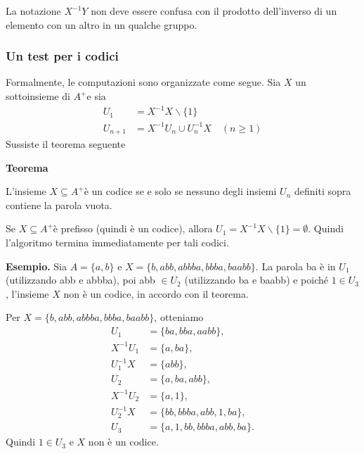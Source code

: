 La notazione $X^{-1} Y$ non deve essere confusa con il prodotto dell'inverso di un elemento con un altro in un qualche gruppo.

\subsubsection{Un test per i codici}

Formalmente, le computazioni sono organizzate come segue. Sia $X$ un sottoinsieme di $A^{+}$e sia
$$
\begin{aligned}
U_{1} &=X^{-1} X \backslash\{1\} \\
U_{n+1} &=X^{-1} U_{n} \cup U_{n}^{-1} X \quad(n \geq 1)
\end{aligned}
$$
Sussiste il teorema seguente

\vspace{5mm}

\textbf{Teorema}

L'insieme $X \subseteq A^{+}$è un codice se e solo se nessuno degli insiemi $U_{n}$ definiti sopra contiene la parola vuota.

\vspace{5mm}

Se $X \subseteq A^{+}$è prefisso (quindi è un codice), allora $U_{1}=X^{-1} X \backslash\{1\}=\emptyset$. Quindi l'algoritmo termina immediatamente per tali codici.

\textbf{Esempio.} 
Sia $A=\{a, b\}$ e $X=\{b, a b b, a b b b a, b b b a, b a a b b\} .$ La parola ba è in $U_{1}$ (utilizzando abb e abbba), poi abb $\in U_{2}$ (utilizzando ba e baabb) e poiché $1 \in U_{3}$, l'insieme $X$ non è un codice, in accordo con il teorema.

\vspace{5mm}

Per $X=\{b, a b b, a b b b a, b b b a, b a a b b\}$, otteniamo
$$
\begin{aligned}
U_{1} &=\{b a, b b a, a a b b\}, \\
X^{-1} U_{1} &=\{a, b a\}, \\
U_{1}^{-1} X &=\{a b b\}, \\
U_{2} &=\{a, b a, a b b\}, \\
X^{-1} U_{2} &=\{a, 1\}, \\
U_{2}^{-1} X &=\{b b, b b b a, a b b, 1, b a\}, \\
U_{3} &=\{a, 1, b b, b b b a, a b b, b a\} .
\end{aligned}
$$
Quindi $1 \in U_{3}$ e $X$ non è un codice.

\vspace{5mm}

